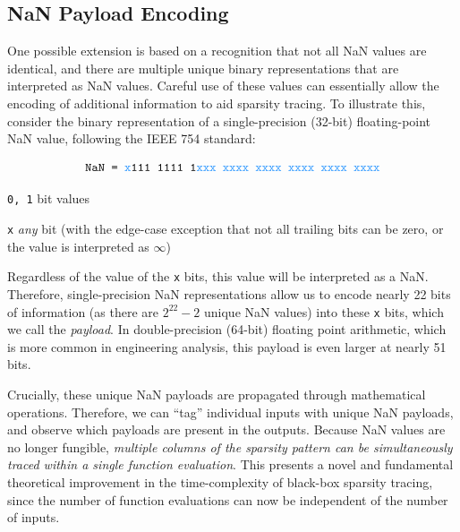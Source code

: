 \documentclass{article}
\begin{document}
\subsection{NaN Payload Encoding}

One possible extension is based on a recognition that not all NaN values are identical, and there are multiple unique binary representations that are interpreted as NaN values. Careful use of these values can essentially allow the encoding of additional information to aid sparsity tracing. To illustrate this, consider the binary representation of a single-precision (32-bit) floating-point NaN value, following the IEEE 754 standard:

\newcommand{\pbit}[1]{\texttt{\textcolor{mydodgerblue}{#1}}} %

\begin{equation*}
    \texttt{NaN = \textcolor{mydodgerblue}{x}111 1111 1\textcolor{mydodgerblue}{xxx xxxx xxxx xxxx xxxx xxxx}}
\end{equation*}


\begin{eqexpl}[20mm]
    \item {\texttt{0, 1}} bit values
    \item {\pbit{x}} \emph{any} bit (with the edge-case exception that not all trailing bits can be zero, or the value is interpreted as $\infty$)
\end{eqexpl}

Regardless of the value of the \pbit{x} bits, this value will be interpreted as a NaN. Therefore, single-precision NaN representations allow us to encode nearly 22 bits of information (as there are $2^{22} - 2$ unique NaN values) into these \pbit{x} bits, which we call the \emph{payload}. In double-precision (64-bit) floating point arithmetic, which is more common in engineering analysis, this payload is even larger at nearly 51 bits.

Crucially, these unique NaN payloads are propagated through mathematical operations. Therefore, we can ``tag'' individual inputs with unique NaN payloads, and observe which payloads are present in the outputs. Because NaN values are no longer fungible, \emph{multiple columns of the sparsity pattern can be simultaneously traced within a single function evaluation}. This presents a novel and fundamental theoretical improvement in the time-complexity of black-box sparsity tracing, since the number of function evaluations can now be independent of the number of inputs.
\end{document}
